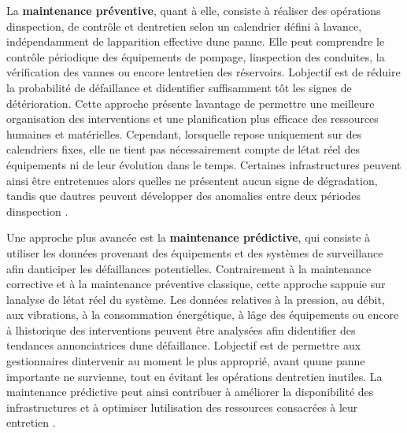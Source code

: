 \documentclass[12pt,a4paper,oneside]{report}
\begin{document}
La \textbf{maintenance préventive}, quant à elle, consiste à réaliser
des opérations d\textquotesingle inspection, de contrôle et
d\textquotesingle entretien selon un calendrier défini à
l\textquotesingle avance, indépendamment de l\textquotesingle apparition
effective d\textquotesingle une panne. Elle peut comprendre le contrôle
périodique des équipements de pompage, l\textquotesingle inspection des
conduites, la vérification des vannes ou encore
l\textquotesingle entretien des réservoirs. L\textquotesingle objectif
est de réduire la probabilité de défaillance et
d\textquotesingle identifier suffisamment tôt les signes de
détérioration. Cette approche présente l\textquotesingle avantage de
permettre une meilleure organisation des interventions et une
planification plus efficace des ressources humaines et matérielles.
Cependant, lorsqu\textquotesingle elle repose uniquement sur des
calendriers fixes, elle ne tient pas nécessairement compte de
l\textquotesingle état réel des équipements ni de leur évolution dans le
temps. Certaines infrastructures peuvent ainsi être entretenues alors
qu\textquotesingle elles ne présentent aucun signe de dégradation,
tandis que d\textquotesingle autres peuvent développer des anomalies
entre deux périodes d\textquotesingle inspection \cite{ref49}.

Une approche plus avancée est la \textbf{maintenance prédictive}, qui
consiste à utiliser les données provenant des équipements et des
systèmes de surveillance afin d\textquotesingle anticiper les
défaillances potentielles. Contrairement à la maintenance corrective et
à la maintenance préventive classique, cette approche
s\textquotesingle appuie sur l\textquotesingle analyse de
l\textquotesingle état réel du système. Les données relatives à la
pression, au débit, aux vibrations, à la consommation énergétique, à
l\textquotesingle âge des équipements ou encore à
l\textquotesingle historique des interventions peuvent être analysées
afin d\textquotesingle identifier des tendances annonciatrices
d\textquotesingle une défaillance. L\textquotesingle objectif est de
permettre aux gestionnaires d\textquotesingle intervenir au moment le
plus approprié, avant qu\textquotesingle une panne importante ne
survienne, tout en évitant les opérations d\textquotesingle entretien
inutiles. La maintenance prédictive peut ainsi contribuer à améliorer la
disponibilité des infrastructures et à optimiser
l\textquotesingle utilisation des ressources consacrées à leur entretien
\cite{ref47}.
\end{document}
